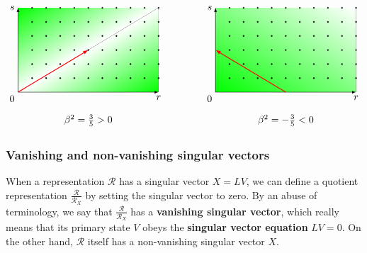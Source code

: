 \documentclass[12pt, a4paper]{article}
\newcommand{\myindex}[1]{\textbf{\boldmath #1}}
\begin{document}
\begin{align}
 \begin{tikzpicture}[baseline=(base), scale = .5]
 \coordinate (base) at (0, 2);
\begin{scope}
 \clip (0, 0) rectangle (10, 6);
 \begin{scope}[transform canvas={rotate=31}]
 \fill[top color=green] (0,0) rectangle (11.6,5.2);
 \end{scope}
 \begin{scope}[transform canvas={rotate=31}]
 \fill[bottom color=green, top color = white] (0,-5.2) rectangle (11.6,0);
 \end{scope}
 \end{scope}
  \draw[latex-latex] (0, 6) node [left] {$s$} -- (0, 0) node[below left] {$0$} -- (10, 0) node [below] {$r$};
  \draw[thick, red, -latex] (0, 0) -- (5, 3);
  \foreach \r in {1,...,10}{
  \foreach \s in {1,...,6}{
  \filldraw (\r, \s) circle [radius = 1.3pt];
  }}
  \node at (5, -2) {$\beta^2 = \frac35>0$};
 \end{tikzpicture}
\qquad \qquad 
\begin{tikzpicture}[baseline=(base), scale = .5]
 \coordinate (base) at (0, 2);
 \begin{scope}
  \clip (0, 0) rectangle (10, 6);
  \begin{scope}[transform canvas={rotate=-31}]
  \fill[bottom color=green, top color = white] (-7,0) rectangle (13,10.3);
  \end{scope}
 \end{scope}
  \draw[latex-latex] (0, 6) node [left] {$s$} -- (0, 0) node[below left] {$0$} -- (10, 0) node [below] {$r$};
  \draw[thick, red, -latex] (5, 0) -- (0, 3);
  \foreach \r in {1,...,10}{
  \foreach \s in {1,...,6}{
  \filldraw (\r, \s) circle [radius = 1.3pt];
  }}
  \node at (5, -2) {$\beta^2 = -\frac35<0$};
 \end{tikzpicture}
\end{align}

\subsubsection{Vanishing and non-vanishing singular vectors}

When a representation $\mathcal{R}$ has a singular vector $X{}=LV{}$, we can define a quotient representation $\frac{\mathcal{R}}{\mathcal{R}_{X{}}}$ by setting the singular vector to zero.
By an abuse of terminology, we say that $\frac{\mathcal{R}}{\mathcal{R}_{X{}}}$ has a \myindex{vanishing singular vector}, which really means that its primary state $V{}$ obeys the \myindex{singular vector equation} $LV{}=0$. On the other hand, $\mathcal{R}$ itself has a non-vanishing singular vector $X{}$.
\end{document}
